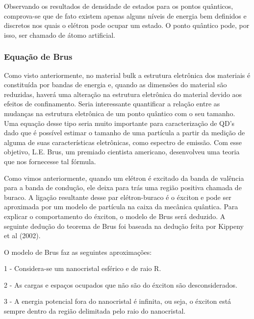 	\par Observando os resultados de densidade de estados para os pontos quânticos, comprova-se que de fato existem apenas alguns níveis de energia bem definidos e discretos nos quais o elétron pode ocupar um estado. O ponto quântico pode, por isso, ser chamado de átomo artificial. 

\subsubsection{Equação de Brus}
	
	\par Como visto anteriormente, no material bulk a estrutura eletrônica dos materiais é constituída por  bandas de energia  e, quando as dimensões do material são reduzidas, haverá uma alteração na estrutura eletrônica do material devido aos efeitos de confinamento. Seria interessante quantificar a relação entre as mudanças na estrutura eletrônica de um ponto quântico com o seu tamanho. Uma equação desse tipo seria muito importante para caracterização de QD’s dado que é possível estimar o tamanho de uma partícula a partir da medição de alguma de suas características eletrônicas, como espectro de emissão. Com esse objetivo, L.E. Brus, um premiado cientista americano, desenvolveu uma teoria que nos fornecesse tal fórmula.
 
	\par Como vimos anteriormente, quando um elétron é excitado da banda de valência para a banda de condução, ele deixa para trás uma região positiva chamada de buraco. A ligação resultante desse par elétron-buraco é o éxciton e pode ser aproximada por um modelo de partícula na caixa da mecânica quântica. Para explicar o comportamento do éxciton, o modelo de Brus será deduzido. A seguinte dedução do teorema de Brus foi baseada na dedução feita por Kippeny et al (2002).

	\par O modelo de Brus faz as seguintes aproximações: 

	\par 1 - Considera-se um nanocristal esférico e de raio R.
 
	\par 2 - As cargas e espaços ocupados que não são do éxciton são desconsiderados.
 
	\par 3 - A energia potencial fora do nanocristal é infinita, ou seja, o éxciton está sempre dentro da região delimitada pelo raio do nanocristal.
 
